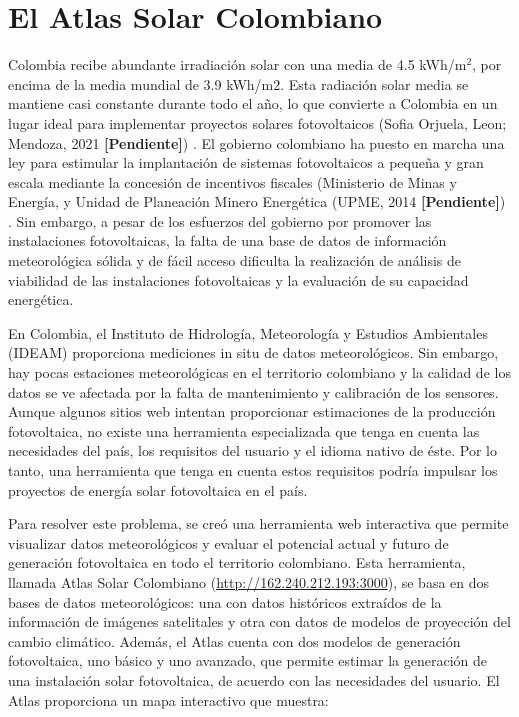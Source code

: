 \section{El Atlas Solar Colombiano}
Colombia recibe abundante irradiación solar con una media de 4.5 kWh/m$^2$, por encima de la media mundial de 3.9 kWh/m$2$. Esta radiación solar media se 
mantiene casi constante durante todo el año, lo que convierte a Colombia en un lugar ideal para implementar proyectos solares fotovoltaicos (Sofia Orjuela, 
Leon; Mendoza, 2021 \textbf{[Pendiente]}) . El gobierno colombiano ha puesto en marcha una ley para estimular la implantación de sistemas fotovoltaicos a 
pequeña y gran escala mediante la concesión de incentivos fiscales (Ministerio de Minas y Energía, y Unidad de Planeación Minero Energética (UPME, 2014 
\textbf{[Pendiente]}) . Sin embargo, a pesar de los esfuerzos del gobierno por promover las instalaciones fotovoltaicas, la falta de una base de datos de 
información meteorológica sólida y de fácil acceso dificulta la realización de análisis de viabilidad de las instalaciones fotovoltaicas y la evaluación de su 
capacidad energética. 

En Colombia, el Instituto de Hidrología, Meteorología y Estudios Ambientales (IDEAM) proporciona mediciones in situ de datos meteorológicos. Sin embargo, hay 
pocas estaciones meteorológicas en el territorio colombiano y la calidad de los datos se ve afectada por la falta de mantenimiento y calibración de los 
sensores. Aunque algunos sitios web intentan proporcionar estimaciones de la producción fotovoltaica, no existe una herramienta especializada que tenga en 
cuenta las necesidades del país, los requisitos del usuario y el idioma nativo de éste. Por lo tanto, una herramienta que tenga en cuenta estos requisitos 
podría impulsar los proyectos de energía solar fotovoltaica en el país.

Para resolver este problema, se creó una herramienta web interactiva que permite visualizar datos meteorológicos y evaluar el potencial actual y futuro de 
generación fotovoltaica en todo el territorio colombiano. Esta herramienta, llamada Atlas Solar Colombiano (\url{http://162.240.212.193:3000}), se basa en dos 
bases de datos meteorológicos: una con datos históricos extraídos de la información de imágenes satelitales y otra con datos de modelos de proyección del 
cambio climático. Además, el Atlas cuenta con dos modelos de generación fotovoltaica, uno básico y uno avanzado, que permite estimar la generación de una 
instalación solar fotovoltaica, de acuerdo con las necesidades del usuario. El Atlas proporciona un mapa interactivo que muestra:

